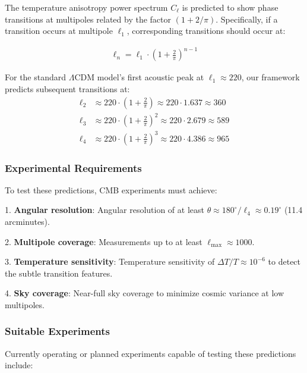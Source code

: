 \documentclass[11pt,english,twoside]{article}
\begin{document}
The temperature anisotropy power spectrum $C_\ell$ is predicted to show phase transitions at multipoles related by the factor $(1 + 2/\pi)$. Specifically, if a transition occurs at multipole $\ell_1$, corresponding transitions should occur at:

\begin{align}
\ell_n = \ell_1 \cdot \left(1 + \frac{2}{\pi}\right)^{n-1}
\end{align}

For the standard $\Lambda$CDM model's first acoustic peak at $\ell_1 \approx 220$, our framework predicts subsequent transitions at:
\begin{align}
\ell_2 &\approx 220 \cdot \left(1 + \frac{2}{\pi}\right) \approx 220 \cdot 1.637 \approx 360\\
\ell_3 &\approx 220 \cdot \left(1 + \frac{2}{\pi}\right)^2 \approx 220 \cdot 2.679 \approx 589\\
\ell_4 &\approx 220 \cdot \left(1 + \frac{2}{\pi}\right)^3 \approx 220 \cdot 4.386 \approx 965
\end{align}

\subsubsection{Experimental Requirements}

To test these predictions, CMB experiments must achieve:

1. \textbf{Angular resolution}: Angular resolution of at least $\theta \approx 180^{\circ}/\ell_4 \approx 0.19^{\circ}$ (11.4 arcminutes).

2. \textbf{Multipole coverage}: Measurements up to at least $\ell_{\text{max}} \approx 1000$.

3. \textbf{Temperature sensitivity}: Temperature sensitivity of $\Delta T/T \approx 10^{-6}$ to detect the subtle transition features.

4. \textbf{Sky coverage}: Near-full sky coverage to minimize cosmic variance at low multipoles.

\subsubsection{Suitable Experiments}

Currently operating or planned experiments capable of testing these predictions include:
\end{document}
